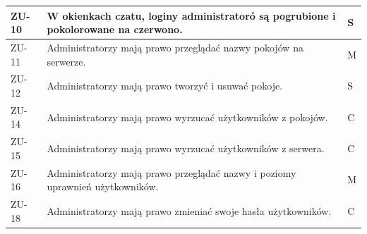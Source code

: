 \begin{tabular}{ | l | l | l | }
    \hline
    ZU-10 & \parbox[t]{14cm}{
      W okienkach czatu, loginy administratoró są pogrubione i pokolorowane na czerwono.
      } & S \\

    \hline
    ZU-11 & \parbox[t]{14cm}{
      Administratorzy mają prawo przeglądać nazwy pokojów na serwerze.
    } & M \\

    \hline
    ZU-12 & \parbox[t]{14cm}{
      Administratorzy mają prawo tworzyć i usuwać pokoje.
    } & S \\

    \hline
    ZU-14 & \parbox[t]{14cm}{
      Administratorzy mają prawo wyrzucać użytkowników z pokojów.
    } & C \\

    \hline
    ZU-15 & \parbox[t]{14cm}{
      Administratorzy mają prawo wyrzucać użytkowników z serwera.
    } & C \\

    \hline
    ZU-16 & \parbox[t]{14cm}{
      Administratorzy mają prawo przeglądać nazwy i poziomy uprawnień użytkowników.
    } & M \\

    \hline
    ZU-18 & \parbox[t]{14cm}{
      Administratorzy mają prawo zmieniać swoje hasła użytkowników.
    } & C \\

    \hline
  \end{tabular}

